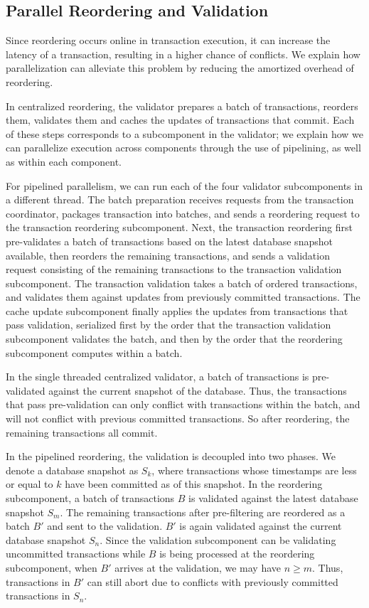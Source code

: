\subsection{Parallel Reordering and Validation}
\label{subsec:validator_reordering:parallel}
Since reordering occurs online in transaction execution, it can increase the latency of a transaction, resulting in a higher chance of conflicts. We explain how parallelization can alleviate this problem by reducing the amortized overhead of reordering.

In centralized reordering, the validator prepares a batch of transactions, reorders them,  validates them and caches the updates of transactions that commit. Each of these steps corresponds to a subcomponent in the validator; we explain how we can parallelize execution across components through the use of pipelining, as well as within each component. 

For pipelined parallelism, we can run each of the four validator subcomponents in a different thread. The batch preparation receives requests from the transaction coordinator, packages transaction into batches, and sends a reordering request to the transaction reordering subcomponent. Next, the transaction reordering first pre-validates a batch of transactions based on the latest database snapshot available, then reorders the remaining transactions, and sends a validation request consisting of the remaining transactions to the transaction validation subcomponent. 
The transaction validation takes a batch of ordered
transactions, and validates them against updates from previously committed
transactions. The cache update subcomponent finally applies the updates from
transactions that pass validation, serialized first by the order that the transaction validation subcomponent validates the batch, and then by the order that the reordering subcomponent computes within a batch. 

In the single threaded centralized validator, a batch of transactions is
pre-validated against the current snapshot of the database. Thus, the
transactions that pass pre-validation can only conflict with transactions within the batch, and will not conflict with previous committed transactions. So after reordering, the remaining transactions all commit.

In the pipelined reordering, the validation is decoupled into two phases. We denote a database snapshot as $S_k$, where transactions whose timestamps are less or equal to $k$ have been committed as of this snapshot. In the reordering subcomponent, a batch of transactions $B$ is validated against the latest database snapshot $S_m$. The remaining transactions after pre-filtering are reordered as a batch $B'$ and sent to the validation. $B'$ is again validated against the current database snapshot $S_n$. Since the validation subcomponent can be validating uncommitted transactions while $B$ is being processed at the reordering subcomponent, when $B'$ arrives at the validation,  we may have $n\geq m$. Thus, transactions in $B'$ can still abort due to conflicts with previously committed transactions in $S_n$.

